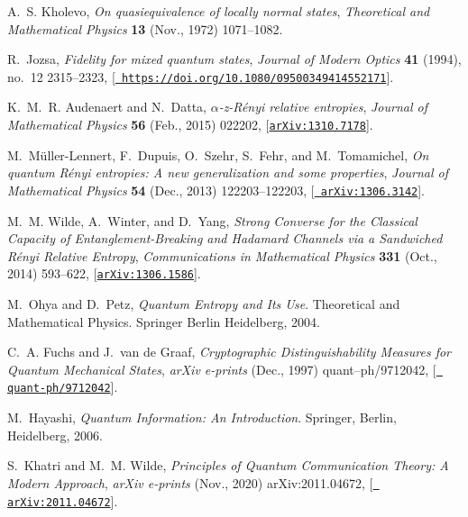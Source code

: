 \documentclass[a4paper,11pt]{article}
\begin{document}
\begin{thebibliography}{100}
A.~S. {Kholevo}, {\it {On quasiequivalence of locally normal states}},  {\em
  Theoretical and Mathematical Physics} {\bf 13} (Nov., 1972) 1071--1082.

R.~Jozsa, {\it Fidelity for mixed quantum states},  {\em Journal of Modern
  Optics} {\bf 41} (1994), no.~12 2315--2323,
  [\href{http://arxiv.org/abs/https://doi.org/10.1080/09500349414552171}{{\tt
  https://doi.org/10.1080/09500349414552171}}].

K.~M.~R. {Audenaert} and N.~{Datta}, {\it {{\ensuremath{\alpha}}-z-R{\'e}nyi
  relative entropies}},  {\em Journal of Mathematical Physics} {\bf 56} (Feb.,
  2015) 022202, [\href{http://arxiv.org/abs/1310.7178}{{\tt arXiv:1310.7178}}].

M.~{M{\"u}ller-Lennert}, F.~{Dupuis}, O.~{Szehr}, S.~{Fehr}, and
  M.~{Tomamichel}, {\it {On quantum R{\'e}nyi entropies: A new generalization
  and some properties}},  {\em Journal of Mathematical Physics} {\bf 54} (Dec.,
  2013) 122203--122203, [\href{http://arxiv.org/abs/1306.3142}{{\tt
  arXiv:1306.3142}}].

M.~M. {Wilde}, A.~{Winter}, and D.~{Yang}, {\it {Strong Converse for the
  Classical Capacity of Entanglement-Breaking and Hadamard Channels via a
  Sandwiched R{\'e}nyi Relative Entropy}},  {\em Communications in Mathematical
  Physics} {\bf 331} (Oct., 2014) 593--622,
  [\href{http://arxiv.org/abs/1306.1586}{{\tt arXiv:1306.1586}}].

M.~Ohya and D.~Petz, {\em Quantum Entropy and Its Use}.
\newblock Theoretical and Mathematical Physics. Springer Berlin Heidelberg,
  2004.

C.~A. {Fuchs} and J.~{van de Graaf}, {\it {Cryptographic Distinguishability
  Measures for Quantum Mechanical States}},  {\em arXiv e-prints} (Dec., 1997)
  quant--ph/9712042, [\href{http://arxiv.org/abs/quant-ph/9712042}{{\tt
  quant-ph/9712042}}].

M.~Hayashi, {\em {Quantum Information: An Introduction}}.
\newblock Springer, Berlin, Heidelberg, 2006.

S.~{Khatri} and M.~M. {Wilde}, {\it {Principles of Quantum Communication
  Theory: A Modern Approach}},  {\em arXiv e-prints} (Nov., 2020)
  arXiv:2011.04672, [\href{http://arxiv.org/abs/2011.04672}{{\tt
  arXiv:2011.04672}}].


\end{thebibliography}
\end{document}
